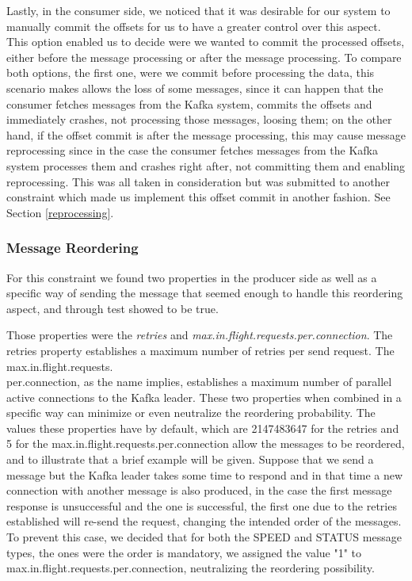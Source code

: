 \documentclass[12pt]{article}
\begin{document}
Lastly, in the consumer side, we noticed that it was desirable for our system to manually commit the offsets for us to have a greater control over this aspect. This option enabled us to decide were we wanted to commit the processed offsets, either before the message processing or after the message processing. To compare both options, the first one, were we commit before processing the data, this scenario makes allows the loss of some messages, since it can happen that the consumer fetches messages from the Kafka system, commits the offsets and immediately crashes, not processing those messages, loosing them; on the other hand, if the offset commit is after the message processing, this may cause message reprocessing since in the case the consumer fetches messages from the Kafka system processes them and crashes right after, not committing them and enabling reprocessing. This was all taken in consideration but was submitted to another constraint which made us implement this offset commit in another fashion. See Section \ref{reprocessing}.


\subsubsection{Message Reordering}
For this constraint we found two properties in the producer side as well as a specific way of sending the message that seemed enough to handle this reordering aspect, and through test showed to be true.

Those properties were the \textit{retries} and \textit{max.in.flight.requests.per.connection}. The retries property establishes a maximum number of retries per send request. The max.in.flight.requests.\\per.connection, as the name implies, establishes a maximum number of parallel active connections to the Kafka leader. These two properties when combined in a specific way can minimize or even neutralize the reordering probability. The values these properties have by default, which are 2147483647 for the retries and 5 for the max.in.flight.requests.per.connection allow the messages to be reordered, and to illustrate that a brief example will be given. Suppose that we send a message but the Kafka leader takes some time to respond and in that time a new connection with another message is also produced, in the case the first message response is unsuccessful and the one is successful, the first one due to the retries established will re-send the request, changing the intended order of the messages. To prevent this case, we decided that for both the SPEED and STATUS message types, the ones were the order is mandatory, we assigned the value "1" to max.in.flight.requests.per.connection, neutralizing the reordering possibility.
\end{document}
